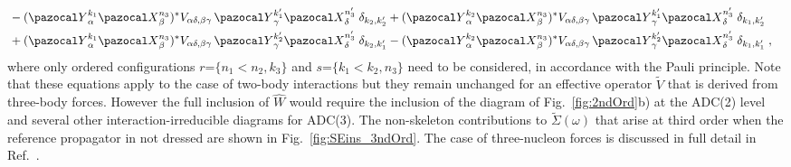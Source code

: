 \begin{subequations}
\begin{align}
\nonumber \\
&{} - ({\pazocal Y}^{k_1}_\alpha    {\pazocal X}^{n_3}_\beta )^* V_{\alpha \delta, \beta \gamma} \, {\pazocal Y}^{k_1'}_\gamma    {\pazocal X}^{n_3'}_\delta   \; \delta_{k_2, k_2'}
 + ({\pazocal Y}^{k_2}_\alpha    {\pazocal X}^{n_3}_\beta )^* V_{\alpha \delta, \beta \gamma} \, {\pazocal Y}^{k_1'}_\gamma    {\pazocal X}^{n_3'}_\delta  \; \delta_{k_1, k_2'}
\label{eq:ADC3_D} \\
&{} + ({\pazocal Y}^{k_1}_\alpha    {\pazocal X}^{n_3}_\beta )^* V_{\alpha \delta, \beta \gamma} \, {\pazocal Y}^{k_2'}_\gamma    {\pazocal X}^{n_3'}_\delta   \; \delta_{k_2, k_1'}
 - ({\pazocal Y}^{k_2}_\alpha    {\pazocal X}^{n_3}_\beta )^* V_{\alpha \delta, \beta \gamma} \, {\pazocal Y}^{k_2'}_\gamma    {\pazocal X}^{n_3'}_\delta  \; \delta_{k_1, k_1'}  \; ,
  \nonumber
\end{align}
\end{subequations}
where  only  ordered configurations $r$=$\{n_1 < n_2, k_3 \}$ and  $s$=$\{k_1 < k_2, n_3 \}$ need to be considered, in accordance
with the Pauli principle.  Note that  these equations apply to the case of  two-body interactions  but they remain unchanged for  an effective operator $\widetilde{V}$ that is derived from three-body forces.  However the full inclusion of $\widehat{W}$ would require the inclusion of the diagram of Fig.~\ref{fig:2ndOrd}b) at the ADC(2) level and several other interaction-irreducible diagrams for ADC(3).  The non-skeleton contributions to $\widetilde\Sigma(\omega)$ that arise at third order when the reference propagator in not dressed are shown in Fig.~\ref{fig:SEins_3ndOrd}. The case of three-nucleon forces is discussed in full detail in Ref.~\cite{ch11_Raimondi_inprep}.


